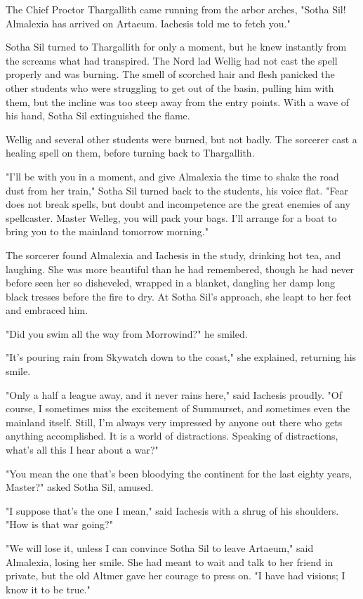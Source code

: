 The Chief Proctor Thargallith came running from the arbor arches, "Sotha Sil! Almalexia has arrived on Artaeum. Iachesis told me to fetch you."

Sotha Sil turned to Thargallith for only a moment, but he knew instantly from the screams what had transpired. The Nord lad Wellig had not cast the spell properly and was burning. The smell of scorched hair and flesh panicked the other students who were struggling to get out of the basin, pulling him with them, but the incline was too steep away from the entry points. With a wave of his hand, Sotha Sil extinguished the flame.

Wellig and several other students were burned, but not badly. The sorcerer cast a healing spell on them, before turning back to Thargallith.

"I'll be with you in a moment, and give Almalexia the time to shake the road dust from her train," Sotha Sil turned back to the students, his voice flat. "Fear does not break spells, but doubt and incompetence are the great enemies of any spellcaster. Master Welleg, you will pack your bags. I'll arrange for a boat to bring you to the mainland tomorrow morning."

The sorcerer found Almalexia and Iachesis in the study, drinking hot tea, and laughing. She was more beautiful than he had remembered, though he had never before seen her so disheveled, wrapped in a blanket, dangling her damp long black tresses before the fire to dry. At Sotha Sil's approach, she leapt to her feet and embraced him.

"Did you swim all the way from Morrowind?" he smiled.

"It's pouring rain from Skywatch down to the coast," she explained, returning his smile.

"Only a half a league away, and it never rains here," said Iachesis proudly. "Of course, I sometimes miss the excitement of Summurset, and sometimes even the mainland itself. Still, I'm always very impressed by anyone out there who gets anything accomplished. It is a world of distractions. Speaking of distractions, what's all this I hear about a war?"

"You mean the one that's been bloodying the continent for the last eighty years, Master?" asked Sotha Sil, amused.

"I suppose that's the one I mean," said Iachesis with a shrug of his shoulders. "How is that war going?"

"We will lose it, unless I can convince Sotha Sil to leave Artaeum," said Almalexia, losing her smile. She had meant to wait and talk to her friend in private, but the old Altmer gave her courage to press on. "I have had visions; I know it to be true."

